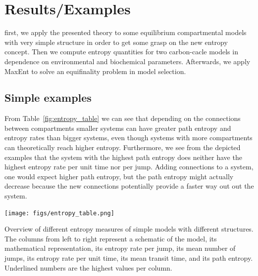 \documentclass[smallextended]{svjour3}
\begin{document}
 
\section{Results/Examples}
first, we apply the presented theory to some equilibrium compartmental models with very simple structure in order to get some grasp on the new entropy concept.
Then we compute entropy quantities for two carbon-cacle models in dependence on environmental and biochemical parameters.
Afterwards, we apply MaxEnt to solve an equifinality problem in model selection.

\subsection{Simple examples}
\label{sec:simple_examples}
From Table~\ref{fig:entropy_table} we can see that depending on the connections between compartments smaller systems can have greater path entropy and entropy rates than bigger systems, even though systems with more compartments can theoretically reach higher entropy.
Furthermore, we see from the depicted examples that the system with the highest path entropy does neither have the highest entropy rate per unit time nor per jump.
Adding connections to a system, one would expect higher path entropy, but the path entropy might actually decrease because the new connections potentially provide a faster way out out the system.

\begin{table}[htbp]
  \centering
  \texttt{[image: figs/entropy\_table.png]}
  \caption{Overview of different entropy measures of simple models with different structures.
  The columns from left to right represent a schematic of the model, its mathematical representation, its entropy rate per jump, its mean number of jumps, its entropy rate per unit time, its mean transit time, and its path entropy.
  Underlined numbers are the highest values per column.}
  \label{fig:entropy_table}
\end{table}
\end{document}
